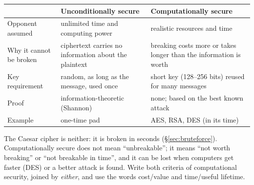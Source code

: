 \begin{center}\small
\begin{tabularx}{\textwidth}{@{}l X X@{}}
\toprule
 & Unconditionally secure & Computationally secure\\
\midrule
Opponent assumed & unlimited time and computing power & realistic resources and time\\
Why it cannot be broken & ciphertext carries no information about the plaintext & breaking costs more or takes longer than the information is worth\\
Key requirement & random, as long as the message, used once & short key (128--256 bits) reused for many messages\\
Proof & information-theoretic (Shannon) & none; based on the best known attack\\
Example & one-time pad & AES, RSA, DES (in its time)\\
\bottomrule
\end{tabularx}
\end{center}

\begin{trap}
The Caesar cipher is neither: it is broken in seconds (\S\ref{sec:bruteforce}). Computationally secure does not mean ``unbreakable''; it means ``not worth breaking'' or ``not breakable in time'', and it can be lost when computers get faster (DES) or a better attack is found. Write both criteria of computational security, joined by \emph{either}, and use the words cost/value and time/useful lifetime.
\end{trap}
